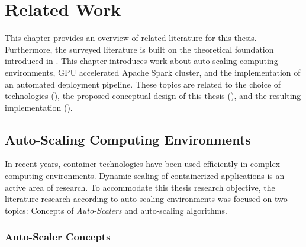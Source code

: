 \chapter{Related Work}
\label{chap:03_related-work}


This chapter provides an overview of related literature for this thesis. Furthermore, the surveyed literature is built on the theoretical foundation introduced in . This chapter introduces work about auto-scaling computing environments, GPU accelerated Apache Spark cluster, and the implementation of an automated deployment pipeline. These topics are related to the choice of technologies (), the proposed conceptual design of this thesis (), and the resulting implementation ().


\section{Auto-Scaling Computing Environments}
In recent years, container technologies have been used efficiently in complex computing environments. Dynamic scaling of containerized applications is an active area of research.
To accommodate this thesis research objective, the literature research according to auto-scaling environments was focused on two topics: Concepts of \textit{Auto-Scalers}  and auto-scaling algorithms.


\subsection{Auto-Scaler Concepts}
